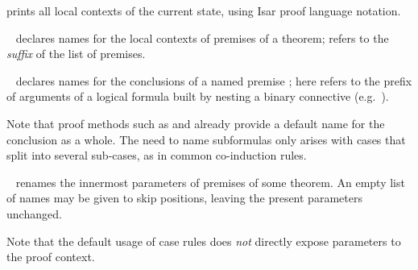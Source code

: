 \begin{isabellebody}
\begin{isamarkuptext}
\begin{description}
  \item \hyperlink{command.print-cases}{\mbox{}} prints all local contexts of the
  current state, using Isar proof language notation.
  
  \item \hyperlink{attribute.case-names}{\mbox{}}~ declares names for
  the local contexts of premises of a theorem; 
  refers to the \emph{suffix} of the list of premises.
  
  \item \hyperlink{attribute.case-conclusion}{\mbox{}}~ declares
  names for the conclusions of a named premise ; here  refers to the prefix of arguments of a logical formula
  built by nesting a binary connective (e.g.\ \isa{{\isachardoublequote}{\isasymor}{\isachardoublequote}}).
  
  Note that proof methods such as \hyperlink{method.induct}{\mbox{}} and \hyperlink{method.coinduct}{\mbox{}} already provide a default name for the conclusion as a
  whole.  The need to name subformulas only arises with cases that
  split into several sub-cases, as in common co-induction rules.

  \item \hyperlink{attribute.params}{\mbox{}}~ renames
  the innermost parameters of premises  of some
  theorem.  An empty list of names may be given to skip positions,
  leaving the present parameters unchanged.
  
  Note that the default usage of case rules does \emph{not} directly
  expose parameters to the proof context.
  

\end{description}
\end{isamarkuptext}
\end{isabellebody}
